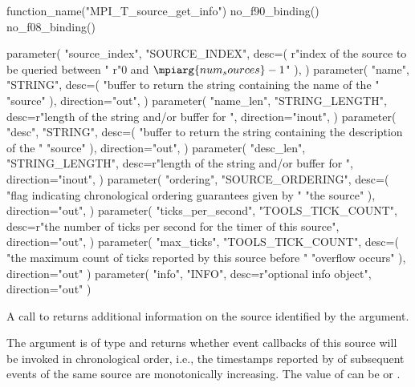 \begin{mpi-binding}
    function_name("MPI_T_source_get_info")
    no_f90_binding()
    no_f08_binding()

    parameter(
        "source_index",
        "SOURCE_INDEX",
        desc=(
            r"index of the source to be queried between "
            r"$0$ and $\mpiarg{num_sources}-1$"
        ),
    )
    parameter(
        "name",
        "STRING",
        desc=(
            "buffer to return the string containing the name of the "
            "source"
        ),
        direction="out",
    )
    parameter(
        "name_len",
        "STRING_LENGTH",
        desc=r"length of the string and/or buffer for ",
        direction="inout",
    )
    parameter(
        "desc",
        "STRING",
        desc=(
            "buffer to return the string containing the description of the "
            "source"
        ),
        direction="out",
    )
    parameter(
        "desc_len",
        "STRING_LENGTH",
        desc=r"length of the string and/or buffer for ",
        direction="inout",
    )
    parameter(
        "ordering",
        "SOURCE_ORDERING",
        desc=(
            "flag indicating chronological ordering guarantees given by "
            "the source"
        ),
        direction="out",
    )
    parameter(
        "ticks_per_second",
        "TOOLS_TICK_COUNT",
        desc=r"the number of ticks per second for the timer of this source",
        direction="out",
    )
    parameter(
        "max_ticks",
        "TOOLS_TICK_COUNT",
        desc=(
            "the maximum count of ticks reported by this source before "
            "overflow occurs"
        ),
        direction="out"
    )
    parameter(
        "info",
        "INFO",
        desc=r"optional info object",
        direction="out"
    )
\end{mpi-binding}

A call to  returns additional
information on the source identified by the 
argument.



The  argument is of type  and returns whether event callbacks of this
source will be invoked in chronological order, i.e., the timestamps reported by
 of subsequent events of the same source are
monotonically increasing. The value of  can be
 or .


